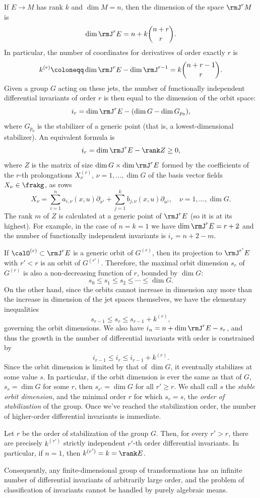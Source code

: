 \begin{rem}\label{rem counting differential invariants}
    If $E\to M$ has rank $k$ and $\dim M=n$, then the dimension of the space $\rmJ^r M$ is 
    \[\dim \rmJ^r E=n+k\binom{n+r}{r}.\]
    In particular, the number of coordinates for derivatives of order exactly $r$ is 
    \[k^{(r)}\coloneqq \dim \rmJ^r E-\dim \rmJ^{r-1}=k\binom{n+r-1}{r}.\]
    Given a group $G$ acting on these jets, the number of functionally independent differential invariants of order $r$ is then equal to the dimension of the orbit space:
    \[i_r=\dim\rmJ^r E-(\dim G-\dim G_{p_0}),\]
    where $G_{p_0}$ is the stabilizer of a generic point (that is, a lowest-dimensional stabilizer). An equivalent formula is 
    \[i_r=\dim \rmJ^r E-\rank Z\geq 0,\]
    where $Z$ is the matrix of size $\dim G\times \dim \rmJ^rE$ formed by the coefficients of the $r$-th prolongations $X_\nu^{(r)}$, $\nu=1,\ldots,\dim G$ of the basis vector fields $X_\nu \in\frakg$, as rows 
    \[X_\nu=\sum_{i=1}^n a_{i,\nu}(x,u)\partial_{x^i}+\sum_{j=1}^k b_{j,\nu}(x,u)\partial_{u^j},\quad \nu=1,\ldots,\dim G.\]
    The rank $m$ of $Z$ is calculated at a generic point of $\rmJ^r E$ (so it is at its highest). For example, in the case of $n=k=1$ we have $\dim\rmJ^r E=r+2$ and the number of functionally independent invariants is $i_r=n+2-m$.

    If $\calO^{(r)}\subset \rmJ^r E$ is a generic orbit of $G^{(r)}$, then its projection to $\rmJ^{r'}E$ with $r'<r$ is an orbit of $G^{(r')}$. Therefore, the maximal orbit dimension $s_r$ of $G^{(r)}$ is also a non-decreasing function of $r$, bounded by $\dim G$:
    \[s_0\leq s_1\leq s_2\leq \cdots \leq \dim G.\]
    On the other hand, since the orbits cannot increase in dimension any more than the increase in dimension of the jet spaces themselves, we have the elementary inequalities 
    \[s_{r-1}\leq s_r\leq s_{r-1}+k^{(r)},\]
    governing the orbit dimensions. We also have $i_n=n+\dim \rmJ^r E-s_r$, and thus the growth in the number of differential invariants with order is constrained by
    \[i_{r-1}\leq i_r\leq i_{r-1}+k^{(r)}.\]
    Since the orbit dimension is limited by that of $\dim G$, it eventually stabilizes at some value $s$.
    In particular, if the orbit dimension is ever the same as that of $G$, $s_r=\dim G$ for some $r$, then $s_{r'}=\dim G$ for all $r'\geq r$. We shall call $s$ the \emph{stable orbit dimension}, and the minimal order $r$ for which $s_r=s$, the \emph{order of stabilization} of the group. Once we've reached the stabilization order, the number of higher-order differential invariants is immediate.

    \begin{prop}
        Let $r$ be the order of stabilization of the group $G$. Then, for every $r'>r$, there are precisely $k^{(r')}$ strictly independent $r'$-th order differential invariants. In particular, if $n=1$, then $k^{(r')}=k=\rank E$.
    \end{prop}

    Consequently, any finite-dimensional group of transformations has an infinite number of differential invariants of arbitrarily large order, and the problem of classification of invariants cannot be handled by purely algebraic means.
\end{rem}

